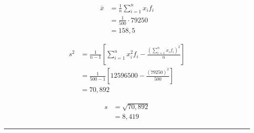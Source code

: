 \documentclass[a4paper,11pt,fleqn]{article}\usepackage[]{graphicx}\usepackage[]{color}
\theoremstyle{definition}
\begin{document}
\begin{compactenum}[6.]
\begin{align*}
  \bar{x} &= \frac{1}{n} \sum_{i=1}^{n} x_i f_i \\
  &= \frac{1}{500} \cdot 79250 \\
          &= 158,5
\end{align*}

\begin{align*}
  s^2 &= \frac{1}{n-1} \left[ \sum_{i=1}^{n} x_{i}^{2} f_i -
    \frac{(\sum_{i=1}^{n} x_{i} f_i)^2}{n} \right] \\
  &= \frac{1}{500-1} \left[ 12596500 - \frac{(79250)^2}{500} \right] \\
  &= 70,892
\end{align*}

\begin{align*}
  s &= \sqrt{70,892} \\
    &= 8,419
\end{align*}

\end{compactenum}

\vspace{0.3cm}
\hrule
\vspace{0.3cm}
\end{document}
